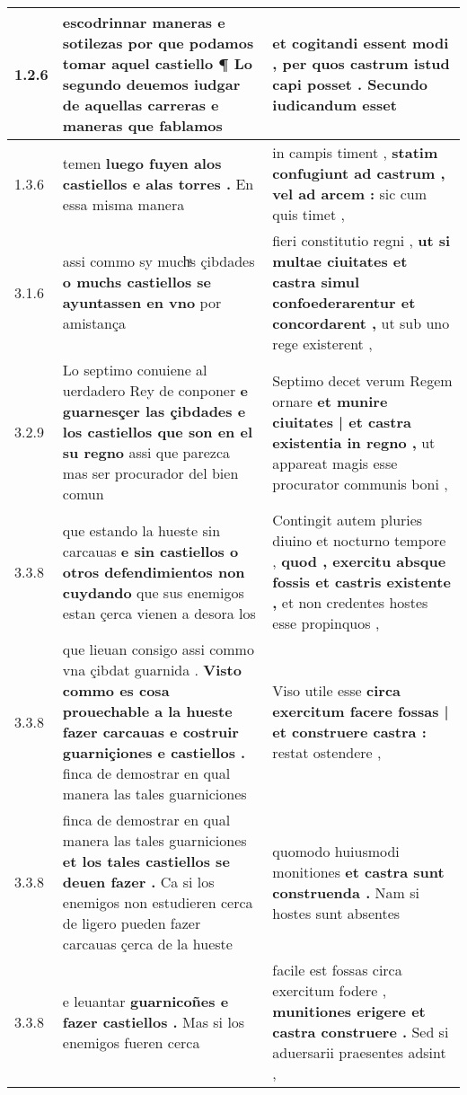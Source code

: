 \begin{tabular}{|p{1cm}|p{6.5cm}|p{6.5cm}|}

\hline
1.2.6 & escodrinnar maneras e sotilezas \textbf{ por que podamos tomar aquel castiello ¶ } Lo segundo deuemos iudgar de aquellas carreras e maneras que fablamos & et cogitandi essent modi , \textbf{ per quos castrum istud capi posset . } Secundo iudicandum esset \\\hline
1.3.6 & temen \textbf{ luego fuyen alos castiellos e alas torres . } En essa misma manera & in campis timent , \textbf{ statim confugiunt ad castrum , vel ad arcem : } sic cum quis timet , \\\hline
3.1.6 & assi commo sy muchͣs çibdades \textbf{ o muchs castiellos se ayuntassen en vno } por amistança & fieri constitutio regni , \textbf{ ut si multae ciuitates et castra simul confoederarentur et concordarent , } ut sub uno rege existerent , \\\hline
3.2.9 & Lo septimo conuiene al uerdadero Rey de conponer \textbf{ e guarnesçer las çibdades e los castiellos que son en el su regno } assi que parezca mas ser procurador del bien comun & Septimo decet verum Regem ornare \textbf{ et munire ciuitates | et castra existentia in regno , } ut appareat magis esse procurator communis boni , \\\hline
3.3.8 & que estando la hueste sin carcauas \textbf{ e sin castiellos o otros defendimientos non cuydando } que sus enemigos estan çerca vienen a desora los & Contingit autem pluries diuino et nocturno tempore , \textbf{ quod , exercitu absque fossis et castris existente , } et non credentes hostes esse propinquos , \\\hline
3.3.8 & que lieuan consigo assi commo vna çibdat guarnida . \textbf{ Visto commo es cosa prouechable a la hueste fazer carcauas e costruir guarniçiones e castiellos . } finca de demostrar en qual manera las tales guarniciones & Viso utile esse \textbf{ circa exercitum facere fossas | et construere castra : } restat ostendere , \\\hline
3.3.8 & finca de demostrar en qual manera las tales guarniciones \textbf{ et los tales castiellos se deuen fazer . } Ca si los enemigos non estudieren cerca de ligero pueden fazer carcauas çerca de la hueste & quomodo huiusmodi monitiones \textbf{ et castra sunt construenda . } Nam si hostes sunt absentes \\\hline
3.3.8 & e leuantar \textbf{ guarnicoñes e fazer castiellos . } Mas si los enemigos fueren cerca & facile est fossas circa exercitum fodere , \textbf{ munitiones erigere et castra construere . } Sed si aduersarii praesentes adsint , \\\hline

\end{tabular}
